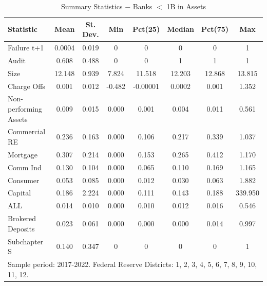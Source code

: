 \documentclass[12pt]{article}
\begin{document}
\begin{table}[H]
\centering
\caption{Summary Statistics $-$ Banks $<$ 1B in Assets}
\label{tab:stats_medium}
\begin{tabular}{lccccccc}
\toprule
Statistic & Mean & St. Dev. & Min & Pct(25) & Median & Pct(75) & Max \\
\midrule
Failure t+1 & 0.0004 & 0.019 & 0 & 0 & 0 & 0 & 1 \\
Audit & 0.608 & 0.488 & 0 & 0 & 1 & 1 & 1 \\
Size & 12.148 & 0.939 & 7.824 & 11.518 & 12.203 & 12.868 & 13.815 \\
Charge Offs & 0.001 & 0.012 & -0.482 & -0.00001 & 0.0002 & 0.001 & 1.352 \\
Non-performing Assets & 0.009 & 0.015 & 0.000 & 0.001 & 0.004 & 0.011 & 0.561 \\
Commercial RE & 0.236 & 0.163 & 0.000 & 0.106 & 0.217 & 0.339 & 1.037 \\
Mortgage & 0.307 & 0.214 & 0.000 & 0.153 & 0.265 & 0.412 & 1.170 \\
Comm Ind & 0.130 & 0.104 & 0.000 & 0.065 & 0.110 & 0.169 & 1.165 \\
Consumer & 0.053 & 0.085 & 0.000 & 0.012 & 0.030 & 0.063 & 1.882 \\
Capital & 0.186 & 2.224 & 0.000 & 0.111 & 0.143 & 0.188 & 339.950 \\
ALL & 0.014 & 0.010 & 0.000 & 0.010 & 0.012 & 0.016 & 0.546 \\
Brokered Deposits & 0.023 & 0.061 & 0.000 & 0.000 & 0.000 & 0.014 & 0.997 \\
Subchapter S & 0.140 & 0.347 & 0 & 0 & 0 & 0 & 1 \\
\bottomrule
\multicolumn{8}{l}{Sample period: 2017-2022. Federal Reserve Districts: 1, 2, 3, 4, 5, 6, 7, 8, 9, 10, 11, 12.}
\end{tabular}
\end{table}
\end{document}
